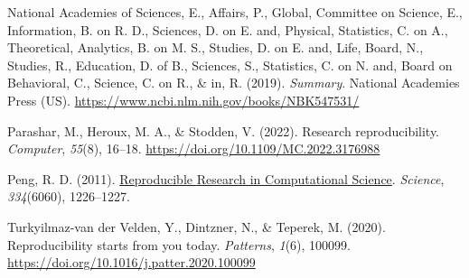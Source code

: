 \documentclass[
  a4paper,
]{article}
\newlength{\cslhangindent}
\newenvironment{CSLReferences}[2] %
 {\begin{list}{}{%
  \setlength{\itemindent}{0pt}
  \setlength{\leftmargin}{0pt}
  \setlength{\parsep}{0pt}
  \ifodd #1
   \setlength{\leftmargin}{\cslhangindent}
   \setlength{\itemindent}{-1\cslhangindent}
  \fi
  \setlength{\itemsep}{#2\baselineskip}}}
 {\end{list}}
\begin{document}
\begin{CSLReferences}{1}{0}
National Academies of Sciences, E., Affairs, P., Global, Committee on
Science, E., Information, B. on R. D., Sciences, D. on E. and, Physical,
Statistics, C. on A., Theoretical, Analytics, B. on M. S., Studies, D.
on E. and, Life, Board, N., Studies, R., Education, D. of B., Sciences,
S., Statistics, C. on N. and, Board on Behavioral, C., Science, C. on
R., \& in, R. (2019). \emph{Summary}. National Academies Press (US).
\url{https://www.ncbi.nlm.nih.gov/books/NBK547531/}

Parashar, M., Heroux, M. A., \& Stodden, V. (2022). Research
reproducibility. \emph{Computer}, \emph{55}(8), 16--18.
\url{https://doi.org/10.1109/MC.2022.3176988}

Peng, R. D. (2011).
\href{https://www.ncbi.nlm.nih.gov/pubmed/22144613}{Reproducible
{Research} in {Computational Science}}. \emph{Science},
\emph{334}(6060), 1226--1227.

Turkyilmaz-van der Velden, Y., Dintzner, N., \& Teperek, M. (2020).
Reproducibility starts from you today. \emph{Patterns}, \emph{1}(6),
100099. \url{https://doi.org/10.1016/j.patter.2020.100099}

\end{CSLReferences}
\end{document}
